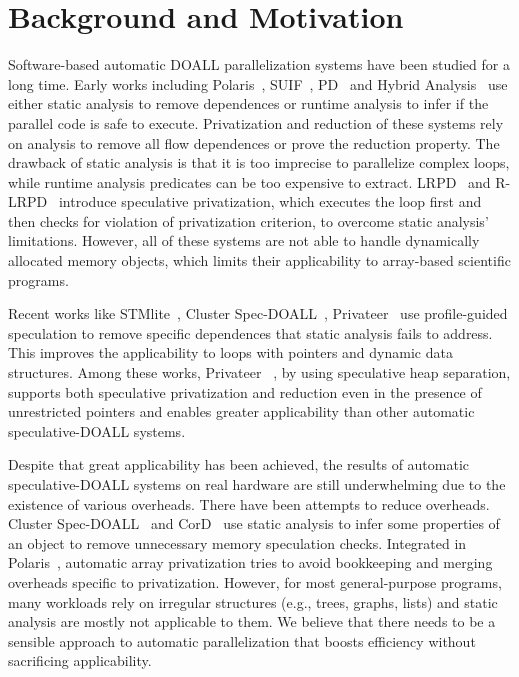 \section{Background and Motivation}
\label{sec:motivation}


Software-based automatic DOALL parallelization systems have been studied
for a long time.
%
Early works including Polaris~\cite{blume:94:polaris},
SUIF~\cite{suif:94:stanford}, PD~\cite{rauchwerger:94:ics} and Hybrid
Analysis~\cite{rus:03:hybrid} use either static analysis to remove
dependences or runtime analysis to infer if the parallel code is safe to
execute. Privatization and reduction of these systems rely on
analysis to remove all flow dependences or prove the reduction property.
The drawback of static analysis is that it is too imprecise to parallelize
complex loops, while runtime analysis predicates can be too expensive to
extract. LRPD~\cite{dang:02:ipdps} and R-LRPD~\cite{dang:02:ipdps}
introduce speculative privatization, which executes the loop first and then
checks for violation of privatization criterion, to overcome static
analysis' limitations. However, all of these systems are not able to handle
dynamically allocated memory objects, which limits their applicability to
array-based scientific programs.

Recent works like STMlite~\cite{mehrara:09:stmlite}, Cluster
Spec-DOALL~\cite{kim:12:cgo}, Privateer~\cite{johnson:12:pldi} use
profile-guided speculation to remove specific dependences that static
analysis fails to address. This improves the applicability to loops with
pointers and dynamic data structures.  Among these works, Privateer
~\cite{johnson:12:pldi}, by using speculative heap separation, supports
both speculative privatization and reduction even in the presence of
unrestricted pointers and enables greater applicability than other
automatic speculative-DOALL systems.

Despite that great applicability has been achieved, the results of
automatic speculative-DOALL systems on real hardware are still
underwhelming due to the existence of various overheads. There have been
attempts to reduce overheads. Cluster Spec-DOALL~\cite{kim:12:cgo} and
CorD~\cite{ctian:2008:micro} use static analysis to infer some properties
of an object to remove unnecessary memory speculation checks. Integrated in
Polaris~\cite{blume:94:polaris}, automatic array
privatization\cite{tu:94:lcpc} tries to avoid bookkeeping and merging
overheads specific to privatization. However, for most general-purpose
programs, many workloads rely on irregular structures (e.g., trees, graphs,
lists) and static analysis are mostly not applicable to them. We believe
that there needs to be a sensible approach to automatic parallelization
that boosts efficiency without sacrificing applicability.


